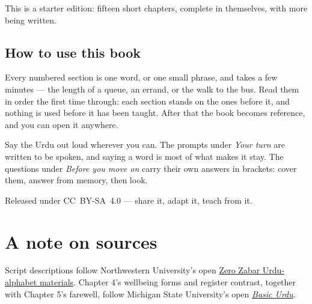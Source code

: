 \documentclass[11pt,twoside]{book}
\begin{document}
This is a starter edition: fifteen short chapters, complete in themselves, with
more being written.

\section*{How to use this book}

Every numbered section is one word, or one small phrase, and takes a few
minutes --- the length of a queue, an errand, or the walk to the bus. Read them
in order the first time through: each section stands on the ones before it, and
nothing is used before it has been taught. After that the book becomes
reference, and you can open it anywhere.

Say the Urdu out loud wherever you can. The prompts under \emph{Your turn} are
written to be spoken, and saying a word is most of what makes it stay. The
questions under \emph{Before you move on} carry their own answers in brackets:
cover them, answer from memory, then look.

Released under CC~BY-SA~4.0 --- share it, adapt it, teach from it.

\tableofcontents

\mainmatter




















\backmatter





\chapter*{A note on sources}

Script descriptions follow Northwestern University's open
\href{https://openbooks.library.northwestern.edu/zerozabar/chapter/the-urdu-alphabet/}%
{Zero Zabar Urdu-alphabet materials}. Chapter 4's wellbeing forms and register
contrast, together with Chapter 5's farewell, follow Michigan State University's
open \href{https://openbooks.lib.msu.edu/urdu/chapter/2-2/}{\emph{Basic Urdu}}.


\end{document}
